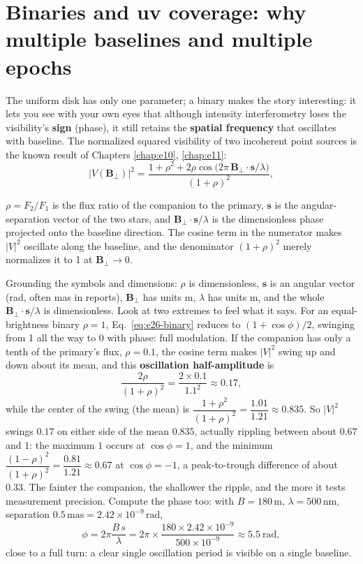 \section{Binaries and uv coverage: why multiple baselines and multiple epochs}
\label{sec:e26-binary}

The uniform disk has only one parameter; a binary makes the story interesting: it lets you see with your own eyes that although intensity interferometry loses the visibility's \textbf{sign} (phase), it still retains the \textbf{spatial frequency} that oscillates with baseline. The normalized squared visibility of two incoherent point sources is the known result of Chapters \ref{chap:e10}, \ref{chap:e11}:
\begin{equation}
  |V(\bm B_\perp)|^2=\frac{1+\rho^2+2\rho\cos\!\big(2\pi\,\bm B_\perp\!\cdot\!\bm s/\lambda\big)}{(1+\rho)^2},
  \label{eq:e26-binary}
\end{equation}
\begin{formulaexplain}
\(\rho=F_2/F_1\) is the flux ratio of the companion to the primary, \(\bm s\) is the angular-separation vector of the two stars, and \(\bm B_\perp\!\cdot\!\bm s/\lambda\) is the dimensionless phase projected onto the baseline direction. The cosine term in the numerator makes \(|V|^2\) oscillate along the baseline, and the denominator \((1+\rho)^2\) merely normalizes it to 1 at \(\bm B_\perp\to0\).
\end{formulaexplain}
Grounding the symbols and dimensions: \(\rho\) is dimensionless, \(\bm s\) is an angular vector (rad, often mas in reports), \(\bm B_\perp\) has units m, \(\lambda\) has units m, and the whole \(\bm B_\perp\!\cdot\!\bm s/\lambda\) is dimensionless. Look at two extremes to feel what it says. For an equal-brightness binary \(\rho=1\), Eq.\ \eqref{eq:e26-binary} reduces to \((1+\cos\phi)/2\), swinging from 1 all the way to 0 with phase: full modulation. If the companion has only a tenth of the primary's flux, \(\rho=0.1\), the cosine term makes \(|V|^2\) swing up and down about its mean, and this \textbf{oscillation half-amplitude} is
\[
  \frac{2\rho}{(1+\rho)^2}=\frac{2\times0.1}{1.1^2}\approx0.17,
\]
while the center of the swing (the mean) is \(\dfrac{1+\rho^2}{(1+\rho)^2}=\dfrac{1.01}{1.21}\approx0.835\). So \(|V|^2\) swings \(0.17\) on either side of the mean \(0.835\), actually rippling between about \(0.67\) and \(1\): the maximum \(1\) occurs at \(\cos\phi=1\), and the minimum \(\dfrac{(1-\rho)^2}{(1+\rho)^2}=\dfrac{0.81}{1.21}\approx0.67\) at \(\cos\phi=-1\), a peak-to-trough difference of about \(0.33\). The fainter the companion, the shallower the ripple, and the more it tests measurement precision. Compute the phase too: with \(B=180\,\mathrm{m}\), \(\lambda=500\,\mathrm{nm}\), separation \(0.5\,\mathrm{mas}=2.42\times10^{-9}\,\mathrm{rad}\),
\[
  \phi=2\pi\frac{B\,s}{\lambda}=2\pi\times\frac{180\times2.42\times10^{-9}}{500\times10^{-9}}\approx5.5\ \mathrm{rad},
\]
close to a full turn: a clear single oscillation period is visible on a single baseline.

